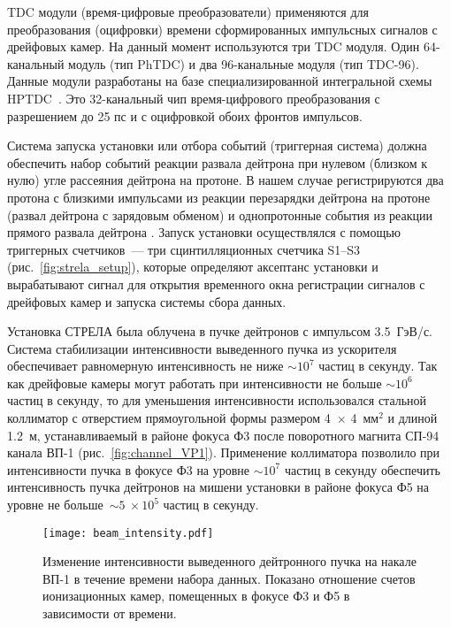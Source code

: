 TDC модули (время-цифровые преобразователи) применяются для преобразования
(оцифровки) времени сформированных импульсных сигналов с дрейфовых камер. На
данный момент используются три TDC модуля. Один 64-канальный модуль (тип PhTDC)
и два 96-канальные модуля (тип TDC-96). Данные модули разработаны на базе
специализированной интегральной схемы HPTDC~\cite{hptdc04}. Это 32-канальный чип
время-цифрового преобразования с разрешением до 25 пс и с оцифровкой обоих
фронтов импульсов.

Система запуска установки или отбора событий (триггерная система) должна
обеспечить набор событий реакции развала дейтрона при нулевом (близком к нулю)
угле рассеяния дейтрона на протоне. В нашем случае регистрируются два протона с
близкими импульсами из реакции перезарядки дейтрона на протоне \dpchex (развал
дейтрона с зарядовым обменом) и однопротонные события из реакции прямого развала
дейтрона \dpret. Запуск установки осуществлялся с помощью триггерных
счетчиков~--- три сцинтилляционных счетчика S1--S3
(рис.~\ref{fig:strela_setup}), которые определяют аксептанс установки и
вырабатывают сигнал для открытия временного окна регистрации сигналов с
дрейфовых камер и запуска системы сбора данных.

Установка СТРЕЛА была облучена в пучке дейтронов с импульсом 3.5~ГэВ/с. Система
стабилизации интенсивности выведенного пучка из ускорителя обеспечивает
равномерную интенсивность не ниже $\sim 10^{7}$ частиц в секунду. Так как
дрейфовые камеры могут работать при интенсивности не больше $\sim 10^{6}$ частиц
в секунду, то для уменьшения интенсивности использовался стальной коллиматор с
отверстием прямоугольной формы размером 4~$\times$ 4~мм$^2$ и длиной 1.2~м,
устанавливаемый в районе фокуса Ф3 после поворотного магнита СП-94 канала ВП-1
(рис.~\ref{fig:channel_VP1}). Применение коллиматора позволило при интенсивности
пучка в фокусе Ф3 на уровне $\sim 10^{7}$ частиц в секунду обеспечить
интенсивность пучка дейтронов на мишени установки в районе фокуса Ф5 на уровне
не больше~$\sim 5~\times 10^{5}$ частиц в секунду.

\begin{figure}[h]
  \centering
  \texttt{[image: beam\_intensity.pdf]}
  \caption{Изменение интенсивности выведенного дейтронного пучка на накале ВП-1
    в течение времени набора данных. Показано отношение счетов ионизационных
    камер, помещенных в фокусе Ф3 и Ф5 в зависимости от времени.}
  \label{fig:beam_intensity}
\end{figure}

